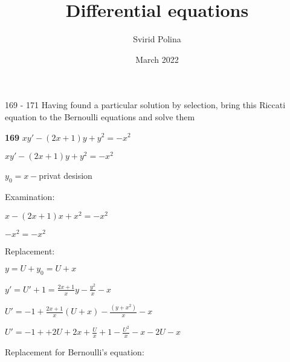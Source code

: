 \documentclass{article}
\title{Differential equations}
\author{Svirid Polina}
\date{March 2022}
\begin{document}
\maketitle
\newpage

169 - 171 Having found a particular solution by selection, bring this Riccati equation to the Bernoulli equations and solve them

\begin{flushleft}
{\bf 169 } $xy'-(2x+1)y+y^2=-x^2$

\end{flushleft}


\begin{center} 
\begin{spacing}{1.5}
$xy'-(2x+1)y+y^2=-x^2$

$y_0 = x - $privat desision
\end{spacing}
\end{center}
Examination:
\begin{center} 
\begin{spacing}{1.5}
$x -(2x+1)x+x^2=-x^2$

$-x^2=-x^2$
\end{spacing}
\end{center}
Replacement:
\begin{center} 
\begin{spacing}{2.5}
$y=U+y_0 = U+x$

$\displaystyle y'=U'+1=\frac{2x+1}{x}y-\frac{y^2}{x}-x$

$\displaystyle U'=-1+\frac{2x+1}{x}(U+x)-\frac{(y+x^2)}{x}-x$

$\displaystyle U'=-1++2U+2x+\frac{U}{x}+1-\frac{U^2}{x}-x-2U-x$

\end{spacing}
\end{center}
Replacement for Bernoulli's equation:
\end{document}
